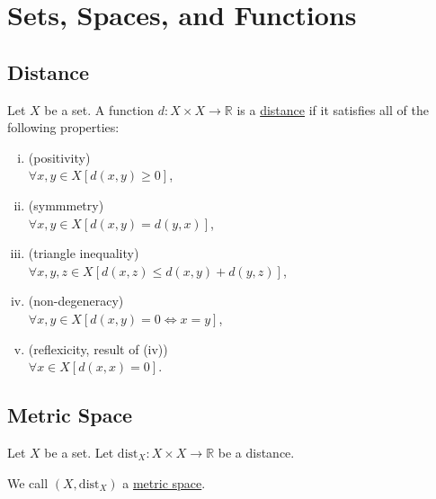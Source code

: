 \section{Sets, Spaces, and Functions}

\subsection{Distance}
\udef Let $X$ be a set. A function $d \colon X \times X \to \mathbb{R}$
is a \ul{distance} if it satisfies all of the following properties:
\begin{enumerate}[(i)]
    \item (positivity)\\ $\forall x,y \in X \left[ d(x,y) \geq 0 \right]$,
    \item (symmmetry)\\ $\forall x,y \in X \left[ d(x,y) = d(y,x) \right]$,
    \item (triangle inequality)\\ $\forall x,y,z \in X \left[
        d(x,z) \leq d(x,y) + d(y,z) \right]$,
    \item (non-degeneracy)\\ $\forall x,y \in X \left[ d(x,y) = 0 \iff x = y \right]$,
    \item (reflexicity, result of (iv))\\ $\forall x \in X \left[ d(x,x) = 0 \right]$.
\end{enumerate}


\subsection{Metric Space}
\udef Let $X$ be a set. Let $\text{dist}_X \colon X \times X \to \mathbb{R}$
be a distance.

We call $(X, \text{dist}_X)$ a \ul{metric space}.


